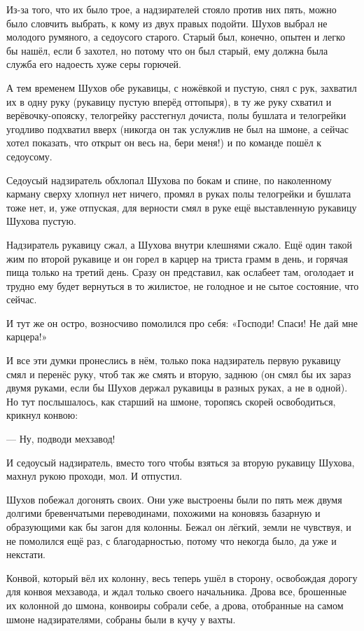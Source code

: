Из-за того, что их было трое, а надзирателей стояло против них пять, можно было словчить \dash
выбрать, к кому из двух правых подойти. Шухов выбрал не молодого румяного, а седоусого
старого. Старый был, конечно, опытен и легко бы нашёл, если б захотел, но потому что он был
старый, ему должна была служба его надоесть хуже серы горючей.

А тем временем Шухов обе рукавицы, с ножёвкой и пустую, снял с рук, захватил их в одну руку
(рукавицу пустую вперёд оттопыря), в ту же руку схватил и верёвочку-опояску, телогрейку
расстегнул дочиста, полы бушлата и телогрейки угодливо подхватил вверх (никогда он так
услужлив не был на шмоне, а сейчас хотел показать, что открыт он весь \dash на, бери меня!) \dash и по
команде пошёл к седоусому.

Седоусый надзиратель обхлопал Шухова по бокам и спине, по наколенному карману сверху
хлопнул \dash нет ничего, промял в руках полы телогрейки и бушлата \dash тоже нет, и, уже отпуская,
для верности смял в руке ещё выставленную рукавицу Шухова \dash пустую.

Надзиратель рукавицу сжал, а Шухова внутри клешнями сжало. Ещё один такой жим по второй
рукавице \dash и он горел в карцер на триста грамм в день, и горячая пища только на третий день.
Сразу он представил, как ослабеет там, оголодает и трудно ему будет вернуться в то жилистое,
не голодное и не сытое состояние, что сейчас.

И тут же он остро, возносчиво помолился про себя: «Господи! Спаси! Не дай мне карцера!»

И все эти думки пронеслись в нём, только пока надзиратель первую рукавицу смял и перенёс
руку, чтоб так же смять и вторую, заднюю (он смял бы их зараз двумя руками, если бы Шухов
держал рукавицы в разных руках, а не в одной). Но тут послышалось, как старший на шмоне,
торопясь скорей освободиться, крикнул конвою:

--- Ну, подводи мехзавод!

И седоусый надзиратель, вместо того чтобы взяться за вторую рукавицу Шухова, махнул рукою \dash
проходи, мол. И отпустил.

Шухов побежал догонять своих. Они уже выстроены были по пять меж двумя долгими бревенчатыми
переводинами, похожими на коновязь базарную и образующими как бы загон для колонны. Бежал он
лёгкий, земли не чувствуя, и не помолился ещё раз, с благодарностью, потому что некогда было,
да уже и некстати.

Конвой, который вёл их колонну, весь теперь ушёл в сторону, освобождая дорогу для конвоя
мехзавода, и ждал только своего начальника. Дрова все, брошенные их колонной до шмона,
конвоиры собрали себе, а дрова, отобранные на самом шмоне надзирателями, собраны были в кучу
у вахты.

